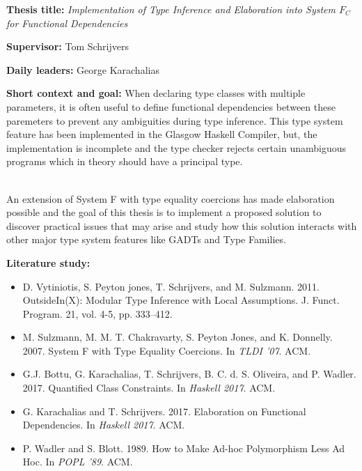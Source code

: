 \documentclass[12pt]{report}
\begin{document}
\pagestyle{myheadings}

{\bf Thesis title:} {\em Implementation of Type Inference and Elaboration into System $F_C$ for Functional Dependencies}

\vspace{0.5cm}
{\bf Supervisor:} Tom Schrijvers


\vspace{0.5cm}
{\bf Daily leaders:} George Karachalias

\vspace{1cm}
{\bf Short context and goal: }
When declaring type classes with multiple parameters, it is often useful to
define functional dependencies between these paremeters to prevent any
ambiguities during type inference. This type system feature has been implemented
in the Glasgow Haskell Compiler, but, the implementation is incomplete and the
type checker rejects certain unambiguous programs which in theory should have a
principal type.

\mbox{}\\
An extension of System F with type equality coercions has made elaboration
possible and the goal of this thesis is to implement a proposed solution to
discover practical issues that may arise and study how this solution interacts
with other major type system features like GADTs and Type Families.

\vspace{1cm}
{\bf Literature study:}
\begin{itemize}
\item
  D. Vytiniotis, S. Peyton jones, T. Schrijvers, and M. Sulzmann. 2011.
  OutsideIn(X): Modular Type Inference with Local Assumptions. J. Funct.
  Program. 21, vol. 4-5, pp. 333--412.
\item
  M. Sulzmann, M. M. T. Chakravarty, S. Peyton Jones, and K. Donnelly. 2007.
  System F with Type Equality Coercions.
  In \textit{TLDI '07}. ACM.
\item
  G.J. Bottu, G. Karachalias, T. Schrijvers, B. C. d. S. Oliveira, and P. Wadler. 2017.
  Quantified Class Constraints.
  In \textit{Haskell 2017}. ACM.
\item
  G. Karachalias and T. Schrijvers. 2017.
  Elaboration on Functional Dependencies. %
  In \textit{Haskell 2017}. ACM.
\item
  P. Wadler and S. Blott. 1989.
  How to Make Ad-hoc Polymorphism Less Ad Hoc.
  In \textit{POPL '89}. ACM.
\end{itemize}
\end{document}
